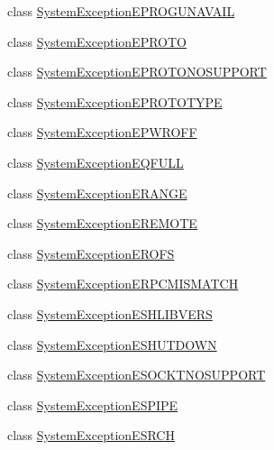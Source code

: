 \begin{DoxyCompactItemize}
class \hyperlink{class_communication_1_1_exception_1_1_system_exception_e_p_r_o_g_u_n_a_v_a_i_l}{System\+Exception\+E\+P\+R\+O\+G\+U\+N\+A\+V\+A\+I\+L}
\item 
class \hyperlink{class_communication_1_1_exception_1_1_system_exception_e_p_r_o_t_o}{System\+Exception\+E\+P\+R\+O\+T\+O}
\item 
class \hyperlink{class_communication_1_1_exception_1_1_system_exception_e_p_r_o_t_o_n_o_s_u_p_p_o_r_t}{System\+Exception\+E\+P\+R\+O\+T\+O\+N\+O\+S\+U\+P\+P\+O\+R\+T}
\item 
class \hyperlink{class_communication_1_1_exception_1_1_system_exception_e_p_r_o_t_o_t_y_p_e}{System\+Exception\+E\+P\+R\+O\+T\+O\+T\+Y\+P\+E}
\item 
class \hyperlink{class_communication_1_1_exception_1_1_system_exception_e_p_w_r_o_f_f}{System\+Exception\+E\+P\+W\+R\+O\+F\+F}
\item 
class \hyperlink{class_communication_1_1_exception_1_1_system_exception_e_q_f_u_l_l}{System\+Exception\+E\+Q\+F\+U\+L\+L}
\item 
class \hyperlink{class_communication_1_1_exception_1_1_system_exception_e_r_a_n_g_e}{System\+Exception\+E\+R\+A\+N\+G\+E}
\item 
class \hyperlink{class_communication_1_1_exception_1_1_system_exception_e_r_e_m_o_t_e}{System\+Exception\+E\+R\+E\+M\+O\+T\+E}
\item 
class \hyperlink{class_communication_1_1_exception_1_1_system_exception_e_r_o_f_s}{System\+Exception\+E\+R\+O\+F\+S}
\item 
class \hyperlink{class_communication_1_1_exception_1_1_system_exception_e_r_p_c_m_i_s_m_a_t_c_h}{System\+Exception\+E\+R\+P\+C\+M\+I\+S\+M\+A\+T\+C\+H}
\item 
class \hyperlink{class_communication_1_1_exception_1_1_system_exception_e_s_h_l_i_b_v_e_r_s}{System\+Exception\+E\+S\+H\+L\+I\+B\+V\+E\+R\+S}
\item 
class \hyperlink{class_communication_1_1_exception_1_1_system_exception_e_s_h_u_t_d_o_w_n}{System\+Exception\+E\+S\+H\+U\+T\+D\+O\+W\+N}
\item 
class \hyperlink{class_communication_1_1_exception_1_1_system_exception_e_s_o_c_k_t_n_o_s_u_p_p_o_r_t}{System\+Exception\+E\+S\+O\+C\+K\+T\+N\+O\+S\+U\+P\+P\+O\+R\+T}
\item 
class \hyperlink{class_communication_1_1_exception_1_1_system_exception_e_s_p_i_p_e}{System\+Exception\+E\+S\+P\+I\+P\+E}
\item 
class \hyperlink{class_communication_1_1_exception_1_1_system_exception_e_s_r_c_h}{System\+Exception\+E\+S\+R\+C\+H}

\end{DoxyCompactItemize}
